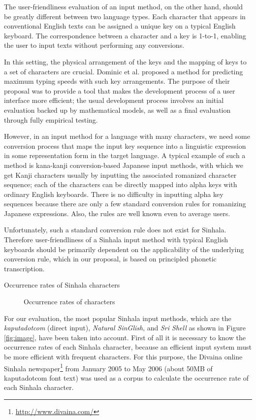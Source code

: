 \documentclass[english]{jnlp_1.3e}
\begin{document}
 The user-friendliness  evaluation of an input method, on the other hand, should be greatly different  between two  language types. 
Each character  that  appears in conventional English texts can be assigned a unique key  on a typical  English keyboard.
The correspondence between a character and a key is 1-to-1, enabling the user to input texts without performing any conversions.

In this setting, the physical arrangement of the keys and the  mapping  of keys to a set of characters are crucial.
Dominic et al. \cite{english_text_input} proposed a method for predicting
maximum typing speeds with such key arrangements. 
The purpose of their proposal was to provide a tool  that  makes the development process of  a  user interface more efficient;  the  usual development process involves an initial evaluation backed up by mathematical models, as well as a final evaluation
through fully empirical testing.

However, in  an input method for a language with many characters, we need some conversion process  that  maps the input key sequence into a linguistic expression in some representation form in the target language. 
A typical example of such a method is kana-kanji conversion-based Japanese input methods, with which we get Kanji characters usually by inputting the associated romanized character sequence; each of the  characters  can be directly mapped into alpha  keys  with  ordinary  English keyboards.
There is no difficulty in inputting alpha key  sequences because  there are only a  few standard  conversion rules for romanizing Japanese expressions. Also, the rules are well known even  to average  users.

Unfortunately, such a standard conversion rule does not exist for Sinhala. 
Therefore user-friendliness of a Sinhala input method with  typical  English keyboards should be primarily dependent on the applicability of the underlying conversion rule,  which in our proposal, is  based on principled phonetic transcription.

\begin{table}[t]
\caption{Occurrence rates of Sinhala characters}

\end{table}

\begin{figure}[t]

  \caption{ Occurrence rates of characters}
\end{figure}

For our evaluation,  the most popular Sinhala input methods,  which are the {\it kaputadotcom} (direct input), {\it Natural SinGlish}, and {\it Sri Shell}  as shown in Figure \ref{fig:image}, have been taken into account. 
First of all it is necessary to know the occurrence rates of each Sinhala character, because an efficient input system must be more efficient with frequent characters. 
For this purpose, the Divaina online Sinhala newspaper\footnote{\url{http://www.divaina.com/}}  from January 2005 to May 2006 
(about 50MB of kaputadotcom font text) was used as a corpus to calculate the occurrence rate of each Sinhala character.
\end{document}
